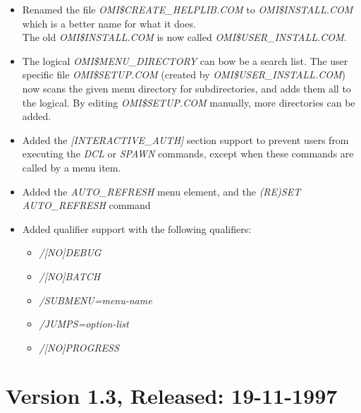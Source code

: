 \documentclass[a4paper]{book}
\begin{document}
\begin{itemize}
\item Renamed the file \textsl{OMI{\$}CREATE{\_}HELPLIB.COM} to \textsl{OMI{\$}INSTALL.COM} which is a better name for what it does. \\
The old \textsl{OMI{\$}INSTALL.COM} is now called \textsl{OMI{\$}USER{\_}INSTALL.COM}.
\item The logical \textsl{OMI{\$}MENU{\_}DIRECTORY} can bow be a search list. The user specific file \textsl{OMI{\$}SETUP.COM} (created by \textsl{OMI{\$}USER{\_}INSTALL.COM}) now scans the given menu directory for subdirectories, and adds them all to the logical. By editing \textsl{OMI{\$}SETUP.COM} manually, more directories can be added.
\item Added the \textsl{[INTERACTIVE{\_}AUTH]} section support to prevent users from executing the \textsl{DCL} or \textsl{SPAWN} commands, except when these commands are called by a menu item.
\item Added the \textsl{AUTO{\_}REFRESH} menu element, and the \textsl{(RE)SET AUTO{\_}REFRESH} command
\item Added qualifier support with the following qualifiers:
\begin{itemize}
\item \textsl{/[NO]DEBUG}
\item \textsl{/[NO]BATCH}
\item \textsl{/SUBMENU=menu-name}
\item \textsl{/JUMPS=option-list}
\item \textsl{/[NO]PROGRESS}
\end{itemize}
\end{itemize}

\section*{Version 1.3, Released: 19-11-1997}
\end{document}
